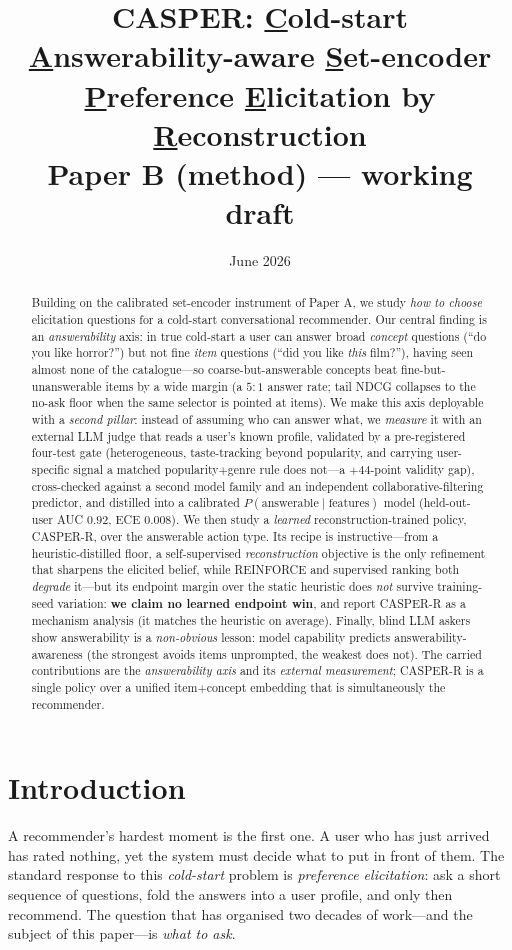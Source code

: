 \documentclass[11pt]{article}
\title{\textbf{CASPER: \underline{C}old-start \underline{A}nswerability-aware \underline{S}et-encoder \underline{P}reference \underline{E}licitation by \underline{R}econstruction}\\[4pt]\large Paper B (method) --- working draft}
\author{}
\date{June 2026}
\begin{document}
\maketitle

\begin{abstract}
\noindent Building on the calibrated set-encoder instrument of Paper A, we study \emph{how to choose} elicitation questions for a
cold-start conversational recommender. Our central finding is an \emph{answerability} axis: in true cold-start a user
can answer broad \emph{concept} questions (``do you like horror?'') but not fine \emph{item} questions (``did you like
\emph{this} film?''), having seen almost none of the catalogue---so coarse-but-answerable concepts beat
fine-but-unanswerable items by a wide margin (a $5{:}1$ answer rate; tail NDCG collapses to the no-ask floor when the
same selector is pointed at items). We make this axis deployable with a \emph{second pillar}: instead of assuming who can
answer what, we \emph{measure} it with an external LLM judge that reads a user's known profile, validated by a
pre-registered four-test gate (heterogeneous, taste-tracking beyond popularity, and carrying user-specific signal a
matched popularity$+$genre rule does not---a $+44$-point validity gap), cross-checked against a second model family and an
independent collaborative-filtering predictor, and distilled into a calibrated $P(\text{answerable}\mid\text{features})$
model (held-out-user AUC $0.92$, ECE $0.008$). We then study a \emph{learned} reconstruction-trained policy, CASPER-R,
over the answerable action type. Its recipe is instructive---from a heuristic-distilled floor, a self-supervised
\emph{reconstruction} objective is the only refinement that sharpens the elicited belief, while REINFORCE and supervised
ranking both \emph{degrade} it---but its endpoint margin over the static heuristic does \emph{not} survive training-seed
variation: \textbf{we claim no learned endpoint win}, and report CASPER-R as a mechanism analysis (it matches the
heuristic on average). Finally, blind LLM askers show answerability is a \emph{non-obvious} lesson: model capability
predicts answerability-awareness (the strongest avoids items unprompted, the weakest does not). The carried
contributions are the \emph{answerability axis} and its \emph{external measurement}; CASPER-R is a single policy over a
unified item$+$concept embedding that is simultaneously the recommender.
\end{abstract}

\section{Introduction}\label{sec:intro}
A recommender's hardest moment is the first one. A user who has just arrived has rated nothing, yet the
system must decide what to put in front of them. The standard response to this \emph{cold-start} problem
is \emph{preference elicitation}: ask a short sequence of questions, fold the answers into a user
profile, and only then recommend. The question that has organised two decades of work---and the subject
of this paper---is \emph{what to ask}.
\end{document}

